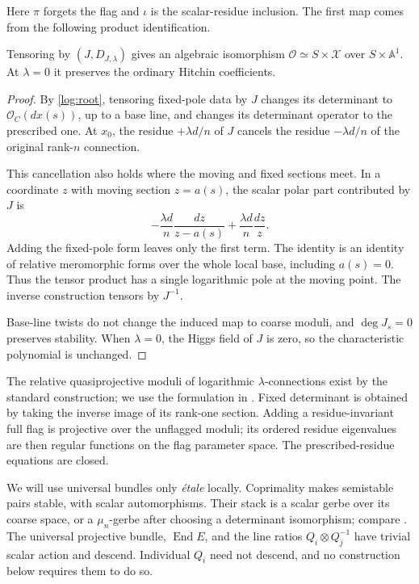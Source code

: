 Here $\pi$ forgets the flag and $\iota$ is the scalar-residue inclusion.
The first map comes from the following product identification.

\begin{lemma}
\label{log:scalar-product}
Tensoring by $(J,D_{J,\lambda})$ gives an algebraic isomorphism
$\mathcal O\simeq S\times\mathcal X$ over $S\times\mathbb A^1$.
At $\lambda=0$ it preserves the ordinary Hitchin coefficients.
\end{lemma}

\begin{proof}
By \eqref{log:root}, tensoring fixed-pole data by $J$ changes its
determinant to $\mathcal O_C(d x(s))$, up to a base line, and changes its
determinant operator to the prescribed one.  At $x_0$, the residue
$+\lambda d/n$ of $J$ cancels the residue $-\lambda d/n$ of the original
rank-$n$ connection.

This cancellation also holds where the moving and fixed sections meet.
In a coordinate $z$ with moving section $z=a(s)$, the scalar polar part
contributed by $J$ is
\[
 -\frac{\lambda d}{n}\frac{dz}{z-a(s)}
 +\frac{\lambda d}{n}\frac{dz}{z}.
\]
Adding the fixed-pole form leaves only the first term.  The identity is an
identity of relative meromorphic forms over the whole local base, including
$a(s)=0$.  Thus the tensor product has a single logarithmic pole at the
moving point.  The inverse construction tensors by $J^{-1}$.

Base-line twists do not change the induced map to coarse moduli, and
$\deg J_s=0$ preserves stability.  When $\lambda=0$, the Higgs field of
$J$ is zero, so the characteristic polynomial is unchanged.
\end{proof}

The relative quasiprojective moduli of logarithmic $\lambda$-connections
exist by the standard construction; we use the formulation in
\cite[Section~2.2]{dCFHLogHodge}.  Fixed determinant is obtained by taking
the inverse image of its rank-one section.  Adding a residue-invariant
full flag is projective over the unflagged moduli; its ordered residue
eigenvalues are then regular functions on the flag parameter space.
The prescribed-residue equations are closed.

We will use universal bundles only \emph{\'etale} locally.  Coprimality
makes semistable pairs stable, with scalar automorphisms.  Their stack is
a scalar gerbe over its coarse space, or a $\mu_n$-gerbe after choosing a
determinant isomorphism; compare
\cite[Lemma~5.3 and Remark~5.4]{dCFHLogHodge}.
The universal projective bundle, $\operatorname{End}E$, and the line
ratios $Q_i\otimes Q_j^{-1}$ have trivial scalar action and descend.
Individual $Q_i$ need not descend, and no construction below requires them
to do so.

